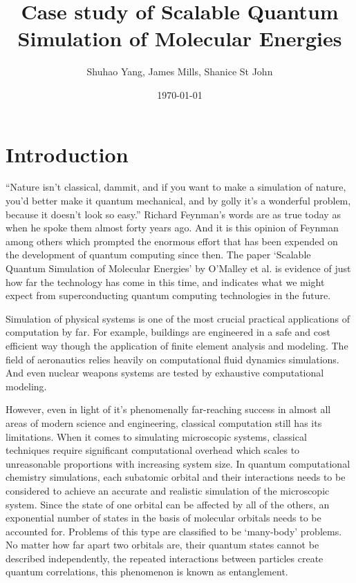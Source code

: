 \documentclass[12pt]{article}
\begin{document}
\title{Case study of Scalable Quantum Simulation of Molecular Energies}
\author{Shuhao Yang, James Mills, Shanice St John}
\date{\today}
\maketitle
\section{Introduction}
``Nature isn't classical, dammit, and if you want to make a simulation of nature, you'd better make it quantum mechanical, and by golly it's a wonderful
 problem, because it doesn't look so easy.” Richard Feynman’s words are as true today as when he spoke them almost forty years ago.
 And it is this opinion of Feynman among others which prompted the enormous effort that has been expended on the development of quantum computing
 since then. The paper `Scalable Quantum Simulation of Molecular Energies' by O’Malley et al. is evidence of just how far the technology
  has come in this time, and indicates what we might expect from superconducting quantum computing technologies in the future.

Simulation of physical systems is one of the most crucial practical applications of computation by far.  For example, buildings are engineered in a safe
and cost efficient way though the application of ﬁnite element analysis and modeling. The field of aeronautics relies heavily on computational ﬂuid
dynamics simulations. And even nuclear weapons systems are tested by exhaustive computational modeling.

However, even in light of it's phenomenally far-reaching success in almost all areas of modern science and engineering, classical computation still
has its limitations. When it comes to simulating microscopic systems, classical techniques require significant computational overhead which scales to
unreasonable proportions with increasing system size. In quantum computational chemistry simulations, each subatomic orbital and their interactions
needs to be considered to achieve an accurate and realistic simulation of the microscopic system. Since the state of one orbital can be affected by
all of the others, an exponential number of states in the basis of molecular orbitals needs to be accounted for. Problems of this type are classified
to be ‘many-body’ problems. No matter how far apart two orbitals are, their quantum states cannot be described independently, the repeated interactions between particles create
quantum correlations, this phenomenon is known as entanglement.
\end{document}

